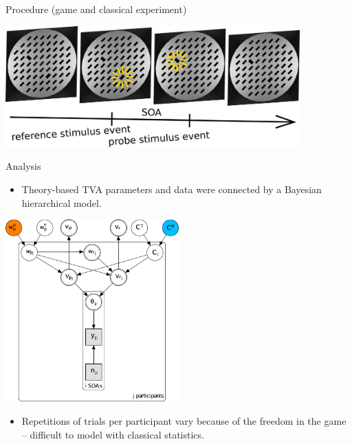 \documentclass[a0paper,portrait]{baposter}
\begin{document}
\begin{poster}
\begin{posterbox}[name=procedure,span=2,column=0,row=2, below=game]{Procedure (game and classical experiment)}
\begin{center}
\includegraphics[width=0.85\textwidth]{procedurev2.pdf}
\end{center}
\end{posterbox}

\begin{posterbox}[name=results,span=1,column=2,row=0]{Analysis}
\begin{itemize}
\item Theory-based TVA parameters and data were connected by a Bayesian hierarchical model.
\end{itemize}
	\begin{center}
	\includegraphics[width=0.5\textwidth]{graphmod.pdf}
	\end{center}
\begin{itemize}
\item Repetitions of trials per participant vary because of the freedom in the game -- difficult to model with classical statistics.
\end{itemize}


\end{posterbox}
\end{poster}
\end{document}
